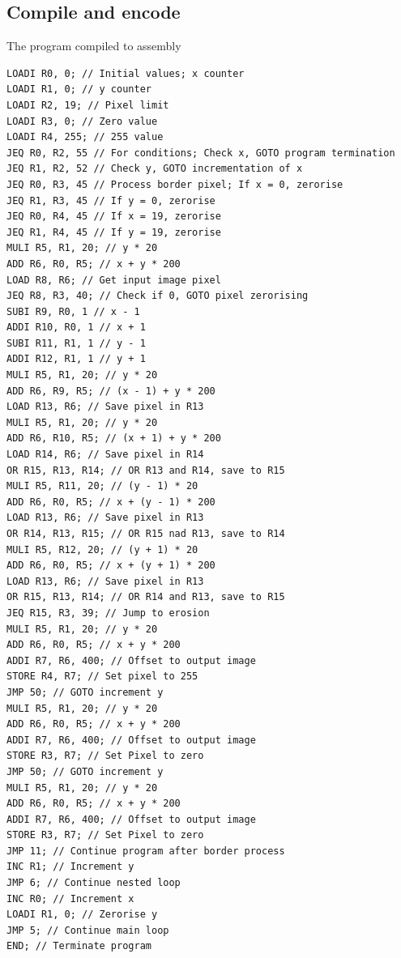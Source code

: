 \documentclass[a4paper, english]{article}
\numberwithin{equation}{section}
\begin{document}
\subsection{Compile and encode}
\begin{listing}[p]
    \centering
    \caption{The program compiled to assembly}\label{lst:ass}
    \begin{verbatim}
LOADI R0, 0; // Initial values; x counter
LOADI R1, 0; // y counter
LOADI R2, 19; // Pixel limit
LOADI R3, 0; // Zero value
LOADI R4, 255; // 255 value
JEQ R0, R2, 55 // For conditions; Check x, GOTO program termination
JEQ R1, R2, 52 // Check y, GOTO incrementation of x
JEQ R0, R3, 45 // Process border pixel; If x = 0, zerorise
JEQ R1, R3, 45 // If y = 0, zerorise
JEQ R0, R4, 45 // If x = 19, zerorise
JEQ R1, R4, 45 // If y = 19, zerorise
MULI R5, R1, 20; // y * 20
ADD R6, R0, R5; // x + y * 200
LOAD R8, R6; // Get input image pixel
JEQ R8, R3, 40; // Check if 0, GOTO pixel zerorising
SUBI R9, R0, 1 // x - 1
ADDI R10, R0, 1 // x + 1
SUBI R11, R1, 1 // y - 1
ADDI R12, R1, 1 // y + 1
MULI R5, R1, 20; // y * 20
ADD R6, R9, R5; // (x - 1) + y * 200
LOAD R13, R6; // Save pixel in R13
MULI R5, R1, 20; // y * 20
ADD R6, R10, R5; // (x + 1) + y * 200
LOAD R14, R6; // Save pixel in R14
OR R15, R13, R14; // OR R13 and R14, save to R15
MULI R5, R11, 20; // (y - 1) * 20
ADD R6, R0, R5; // x + (y - 1) * 200
LOAD R13, R6; // Save pixel in R13
OR R14, R13, R15; // OR R15 nad R13, save to R14
MULI R5, R12, 20; // (y + 1) * 20
ADD R6, R0, R5; // x + (y + 1) * 200
LOAD R13, R6; // Save pixel in R13
OR R15, R13, R14; // OR R14 and R13, save to R15
JEQ R15, R3, 39; // Jump to erosion
MULI R5, R1, 20; // y * 20
ADD R6, R0, R5; // x + y * 200
ADDI R7, R6, 400; // Offset to output image
STORE R4, R7; // Set pixel to 255
JMP 50; // GOTO increment y
MULI R5, R1, 20; // y * 20
ADD R6, R0, R5; // x + y * 200
ADDI R7, R6, 400; // Offset to output image
STORE R3, R7; // Set Pixel to zero
JMP 50; // GOTO increment y
MULI R5, R1, 20; // y * 20
ADD R6, R0, R5; // x + y * 200
ADDI R7, R6, 400; // Offset to output image
STORE R3, R7; // Set Pixel to zero
JMP 11; // Continue program after border process
INC R1; // Increment y
JMP 6; // Continue nested loop
INC R0; // Increment x
LOADI R1, 0; // Zerorise y
JMP 5; // Continue main loop
END; // Terminate program
    \end{verbatim}
\end{listing}
\end{document}
